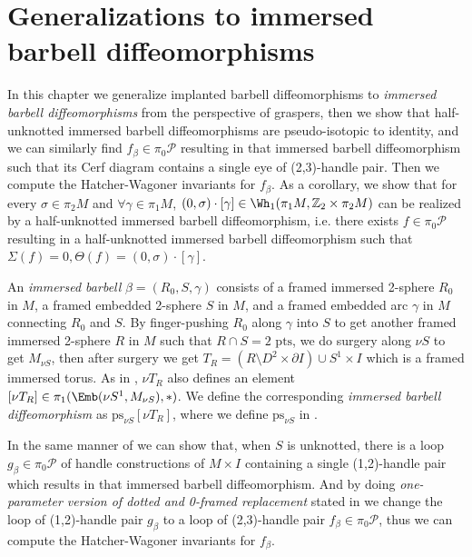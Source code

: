 \chapter{Generalizations to immersed barbell diffeomorphisms}
\label{chap:generalizations-to-immersed-barbell-diffeomorphisms}

In this chapter we generalize implanted barbell diffeomorphisms to \emph{immersed barbell diffeomorphisms} from the perspective of graspers, then we show that half-unknotted immersed barbell diffeomorphisms are pseudo-isotopic to identity, and we can similarly find $f_\beta\in \pi_0\mathcal{P}$ resulting in that immersed barbell diffeomorphism such that its Cerf diagram contains a single eye of (2,3)-handle pair. Then we compute the Hatcher-Wagoner invariants for $f_\beta$. As a corollary, we show that for every $\sigma\in \pi_2 M$ and $\forall \gamma\in \pi_1 M$, $(0,\sigma)\cdot [\gamma]\in \Wh_1(\pi_1 M,\mathbb{Z}_2\times \pi_2 M)$ can be realized by a half-unknotted immersed barbell diffeomorphism, i.e. there exists $f\in \pi_0\mathcal{P}$ resulting in a half-unknotted immersed barbell diffeomorphism such that $\Sigma(f)=0, \Theta(f)=(0,\sigma)\cdot [\gamma]$.

\begin{definition}
    An \emph{immersed barbell} $\beta=(R_0,S,\gamma)$ consists of a framed immersed 2-sphere $R_0$ in $M$, a framed embedded 2-sphere $S$ in $M$, and a framed embedded arc $\gamma$ in $M$ connecting $R_0$ and $S$. By finger-pushing $R_0$ along $\gamma$ into $S$ to get another framed immersed 2-sphere $R$ in $M$ such that $R\cap S=2\text{ pts}$, we do surgery along $\nu S$ to get $M_{\nu S}$, then after surgery we get $T_R=(R\setminus D^2\times \partial I)\cup S^1\times I $ which is a framed immersed torus. As in , $\nu T_R$ also defines an element $[\nu T_R]\in \pi_1(\Emb(\nu S^1, M_{\nu S}), *)$. We define the corresponding \emph{immersed barbell diffeomorphism} as $\text{ps}_{\nu S}[\nu T_R]$, where we define $\text{ps}_{\nu S}$ in . 
\end{definition}

In the same manner of  we can show that, when $S$ is unknotted, there is a loop $g_\beta\in \pi_0\mathcal{P}$ of handle constructions of $M\times I$ containing a single (1,2)-handle pair which results in that immersed barbell diffeomorphism. And by doing \emph{one-parameter version of dotted and 0-framed replacement} stated in  we change the loop of (1,2)-handle pair $g_\beta$ to a loop of (2,3)-handle pair $f_\beta\in \pi_0\mathcal{P}$, thus we can compute the Hatcher-Wagoner invariants for $f_\beta$. 

